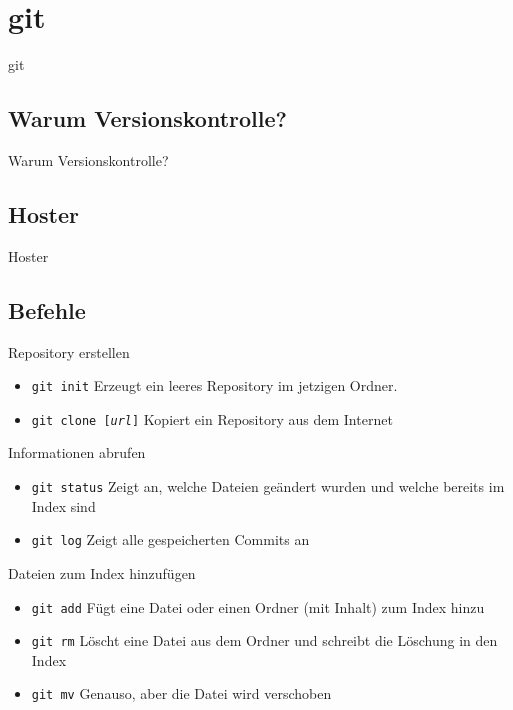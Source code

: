\section{git}
\begin{frame}{git}
  \tableofcontents[sectionstyle=show/hide,
                   subsectionstyle=show/show/hide,
                   subsubsectionstyle=show/show/show]
\end{frame}

\subsection{Warum Versionskontrolle?}
\begin{frame}{Warum Versionskontrolle?}
\end{frame}

\subsection{Hoster}
\begin{frame}{Hoster}
\end{frame}

\subsection{Befehle}
\begin{frame}{Repository erstellen}
  \begin{itemize}
    \item \texttt{git init}  Erzeugt ein leeres Repository im jetzigen Ordner.
    \item \texttt{git clone [\textit{url}]} Kopiert ein Repository aus dem Internet
  \end{itemize}
\end{frame}

\begin{frame}{Informationen abrufen}
  \begin{itemize}
    \item \texttt{git status} Zeigt an, welche Dateien geändert wurden und welche bereits im Index sind
    \item \texttt{git log}    Zeigt alle gespeicherten Commits an
  \end{itemize}
\end{frame}

\begin{frame}{Dateien zum Index hinzufügen}
  \begin{itemize}
    \item \texttt{git add} Fügt eine Datei oder einen Ordner (mit Inhalt) zum Index hinzu
    \item \texttt{git rm}  Löscht eine Datei aus dem Ordner und schreibt die Löschung in den Index
    \item \texttt{git mv}  Genauso, aber die Datei wird verschoben
  \end{itemize}
\end{frame}

